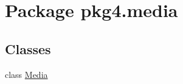 \hypertarget{namespacepkg4_1_1media}{}\section{Package pkg4.\+media}
\label{namespacepkg4_1_1media}
\subsection*{Classes}
\begin{DoxyCompactItemize}
\item 
class \mbox{\hyperlink{classpkg4_1_1media_1_1_media}{Media}}
\end{DoxyCompactItemize}
